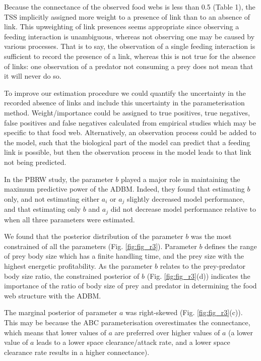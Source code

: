 \documentclass{article}
\begin{document}
Because the connectance of the observed food webs is less than 0.5
(Table 1), the TSS implicitly assigned more weight to a presence of link
than to an absence of link. This upweighting of link presences seems
appropriate since observing a feeding interaction is unambiguous,
whereas not observing one may be caused by various processes. That is to
say, the observation of a single feeding interaction is sufficient to
record the presence of a link, whereas this is not true for the absence
of links: one observation of a predator not consuming a prey does not
mean that it will never do so.

To improve our estimation procedure we could quantify the uncertainty in
the recorded absence of links and include this uncertainty in the
parameterisation method. Weight/importance could be assigned to true
positives, true negatives, false positives and false negatives
calculated from empirical studies which may be specific to that food
web. Alternatively, an observation process could be added to the model,
such that the biological part of the model can predict that a feeding
link is possible, but then the observation process in the model leads to
that link not being predicted.

In the PBRW study, the parameter \(b\) played a major role in
maintaining the maximum predictive power of the ADBM. Indeed, they found
that estimating \(b\) only, and not estimating either \(a_i\) or \(a_j\)
slightly decreased model performance, and that estimating only \(b\) and
\(a_j\) did not decrease model performance relative to when all three
parameters were estimated.

We found that the posterior distribution of the parameter \(b\) was the
most constrained of all the parameters (Fig. \ref{fig:fig_r3}).
Parameter \(b\) defines the range of prey body size which has a finite
handling time, and the prey size with the highest energetic
profitability. As the parameter \(b\) relates to the prey-predator body
size ratio, the constrained posterior of \(b\) (Fig.
\ref{fig:fig_r3}(d)) indicates the importance of the ratio of body size
of prey and predator in determining the food web structure with the
ADBM.

The marginal posterior of parameter \(a\) was right-skewed (Fig.
\ref{fig:fig_r3}(c)). This may be because the ABC parameterisation
overestimates the connectance, which means that lower values of \(a\)
are preferred over higher values of \(a\) (a lower value of \(a\) leads
to a lower space clearance/attack rate, and a lower space clearance rate
results in a higher connectance).
\end{document}
